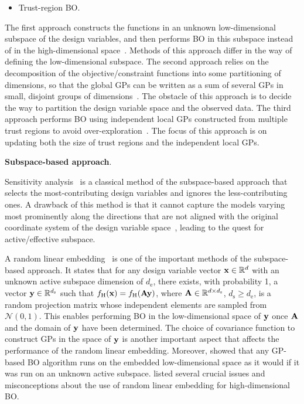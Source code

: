 \documentclass[iicol,sn-basic]{sn-jnl}%
\theoremstyle{thmstyleone}%
\theoremstyle{thmstyletwo}
\theoremstyle{thmstylethree}
\begin{document}
\begin{linenumbers}
\begin{itemize}
	\item Trust-region BO.
\end{itemize}
The first approach constructs the functions in an unknown low-dimensional subspace of the design variables, and then performs BO in this subspace instead of in the high-dimensional space~\citep{ZWang2016,Nayebi2019,Munteanu2019,Letham2020}.
Methods of this approach differ in the way of defining the low-dimensional subspace.
The second approach relies on the decomposition of the objective/constraint functions into some partitioning of dimensions, so that the global GPs can be written as a sum of several GPs in small, disjoint groups of dimensions~\citep{Kandasamy2015,Gardner2017,ZWang2018}.
The obstacle of this approach is to decide the way to partition the design variable space and the observed data. 
The third approach performs BO using independent local GPs constructed from multiple trust regions to avoid over-exploration~\citep{Eriksson2019,Eriksson2021,Daulton2022a}.
The focus of this approach is on updating both the size of trust regions and the independent local GPs.

\noindent
\textbf{Subspace-based approach}.

Sensitivity analysis~\citep{Spagnol2019} is a classical method of the subspace-based approach that selects the most-contributing design variables and ignores the less-contributing ones.
A drawback of this method is that it cannot capture the models varying most prominently along the directions that are not aligned with the original coordinate system of the design variable space~\citep{Constantine2014}, leading to the quest for active/effective subspace.

A random linear embedding~\citep{ZWang2016} is one of the important methods of the subspace-based approach.
It states that for any design variable vector ${\bf x} \in \mathbb{R}^d$ with an unknown active subspace dimension of $d_\text{e}$, there exists, with probability 1, a vector ${\bf y} \in \mathbb{R}^{d_\text{s}}$ such that $f_\text{H}({\bf x}) = f_\text{H}({\bf Ay})$, where ${\bf A} \in \mathbb{R}^{d \times d_\text{s}}$, $d_\text{s} \geq d_\text{e}$, is a random projection matrix whose independent elements are sampled from $\mathcal{N}(0,1)$.
This enables performing BO in the low-dimensional space of ${\bf y}$ once ${\bf A}$ and the domain of ${\bf y}$ have been determined.
The choice of covariance function to construct GPs in the space of ${\bf y}$ is another important aspect that affects the performance of the random linear embedding. 
Moreover, \cite{Munteanu2019} showed that any GP-based BO algorithm runs on the embedded low-dimensional space as it would if it was run on an unknown active subspace.
\cite{Letham2020} listed several crucial issues and misconceptions about the use of random linear embedding for high-dimensional BO.


\end{linenumbers}
\end{document}
